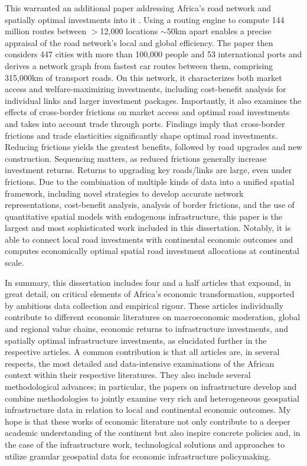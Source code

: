 \documentclass[a4paper]{article}
\begin{document}
This warranted an additional paper addressing Africa's road network and spatially optimal investments into it \citep{krantz2024optimal}. Using a routing engine to compute 144 million routes between $>$12,000 locations $\sim$50km apart enables a precise appraisal of the road network's local and global efficiency. The paper then considers 447 cities with more than 100,000 people and 53 international ports and derives a network graph from fastest car routes between them, comprising 315,000km of transport roads. On this network, it characterizes both market access and welfare-maximizing investments, including cost-benefit analysis for individual links and larger investment packages. Importantly, it also examines the effects of cross-border frictions on market access and optimal road investments and takes into account trade through ports. Findings imply that cross-border frictions and trade elasticities significantly shape optimal road investments. Reducing frictions yields the greatest benefits, followed by road upgrades and new construction. Sequencing matters, as reduced frictions generally increase investment returns. Returns to upgrading key roads/links are large, even under frictions. Due to the combination of multiple kinds of data into a unified spatial framework, including novel strategies to develop accurate network representations, cost-benefit analysis, analysis of border frictions, and the use of quantitative spatial models with endogenous infrastructure, this paper is the largest and most sophisticated work included in this dissertation. Notably, it is able to connect local road investments with continental economic outcomes and computes economically optimal spatial road investment allocations at continental scale. \newline

In summary, this dissertation includes four and a half articles that expound, in great detail, on critical elements of Africa's economic transformation, supported by ambitious data collection and empirical rigour. These articles individually contribute to different economic literatures on macroeconomic moderation, global and regional value chains, economic returns to infrastructure investments, and spatially optimal infrastructure investments, as elucidated further in the respective articles. A common contribution is that all articles are, in several respects, the most detailed and data-intensive examinations of the African context within their respective literatures. They also include several methodological advances; in particular, the papers on infrastructure develop and combine methodologies to jointly examine very rich and heterogeneous geospatial infrastructure data in relation to local and continental economic outcomes. My hope is that these works of economic literature not only contribute to a deeper academic understanding of the continent but also inspire concrete policies and, in the case of the infrastructure work, technological solutions and approaches to utilize granular geospatial data for economic infrastructure policymaking. 

\newpage


\end{document}
